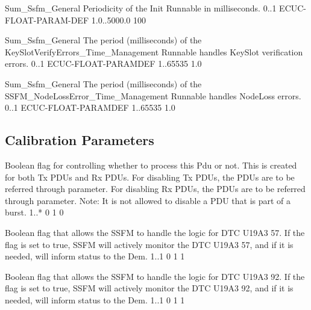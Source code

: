 {Sum_Ssfm_General}
{Periodicity of the Init Runnable in milliseconds.}
{0..1}
{ECUC-FLOAT-PARAM-DEF}
{1.0..5000.0}
{100}

{Sum_Ssfm_General}
{The period (milliseconds) of the KeySlotVerifyErrors_Time_Management Runnable handles KeySlot verification errors.}
{0..1}
{ECUC-FLOAT-PARAMDEF}
{1..65535}
{1.0}

{Sum_Ssfm_General}
{The period (milliseconds) of the SSFM_NodeLossError_Time_Management Runnable handles NodeLoss errors.}
{0..1}
{ECUC-FLOAT-PARAMDEF}
{1..65535}
{1.0}


\subsection{Calibration Parameters}


{Boolean flag for controlling whether to process this Pdu or not.
This is created for both Tx PDUs and Rx PDUs.
For disabling Tx PDUs, the PDUs are to be referred through  parameter.
For disabling Rx PDUs, the PDUs are to be referred through  parameter.
Note: It is not allowed to disable a PDU that is part of a burst.
}
{1..*}
{0}
{1}
{0}

{   }



{Boolean flag that allows the SSFM to handle the logic for DTC U19A3 57. 
If the flag is set to true, SSFM will actively monitor the DTC U19A3 57, and if it is needed, will inform status to the Dem. 
}
{1..1}
{0}
{1}
{1}

{}


{Boolean flag that allows the SSFM to handle the logic for DTC U19A3 92. 
If the flag is set to true, SSFM will actively monitor the DTC U19A3 92, and if it is needed, will inform status to the Dem. 
}
{1..1}
{0}
{1}
{1}

